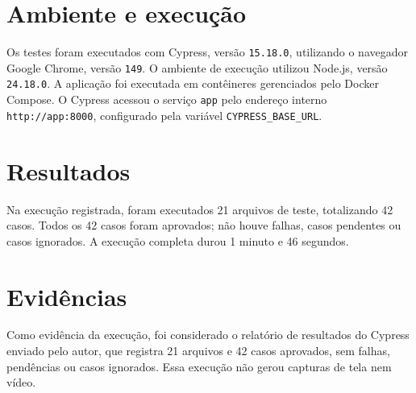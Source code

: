 \section{Ambiente e execução}

Os testes foram executados com Cypress, versão \texttt{15.18.0}, utilizando o navegador Google Chrome, versão \texttt{149}. O ambiente de execução utilizou Node.js, versão \texttt{24.18.0}. A aplicação foi executada em contêineres gerenciados pelo Docker Compose. O Cypress acessou o serviço \texttt{app} pelo endereço interno \texttt{http://app:8000}, configurado pela variável \texttt{CYPRESS\_BASE\_URL}.

\section{Resultados}

Na execução registrada, foram executados 21 arquivos de teste, totalizando 42 casos. Todos os 42 casos foram aprovados; não houve falhas, casos pendentes ou casos ignorados. A execução completa durou 1 minuto e 46 segundos.

\section{Evidências}

Como evidência da execução, foi considerado o relatório de resultados do Cypress enviado pelo autor, que registra 21 arquivos e 42 casos aprovados, sem falhas, pendências ou casos ignorados. Essa execução não gerou capturas de tela nem vídeo.
